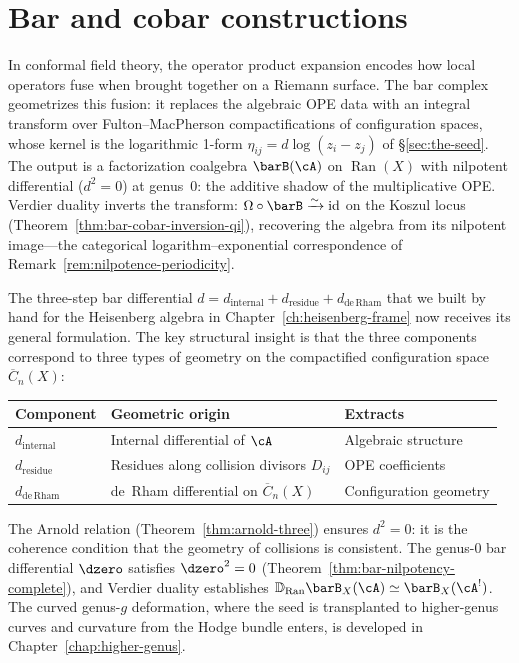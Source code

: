 \chapter{Bar and cobar constructions}
\label{chap:bar-cobar}



In conformal field theory, the operator product expansion encodes how local operators fuse when brought together on a Riemann surface.  The bar complex geometrizes this fusion: it replaces the algebraic OPE data with an integral transform over Fulton--MacPherson compactifications of configuration spaces, whose kernel is the logarithmic 1-form $\eta_{ij} = d\log(z_i - z_j)$ of \S\ref{sec:the-seed}.  The output is a factorization coalgebra $\barB(\cA)$ on $\operatorname{Ran}(X)$ with nilpotent differential ($d^2 = 0$) at genus~$0$: the additive shadow of the multiplicative OPE.  Verdier duality inverts the transform: $\Omega \circ \barB \xrightarrow{\sim} \mathrm{id}$ on the Koszul locus (Theorem~\ref{thm:bar-cobar-inversion-qi}), recovering the algebra from its nilpotent image---the categorical logarithm--exponential correspondence of Remark~\ref{rem:nilpotence-periodicity}.

The three-step bar differential
$d = d_{\mathrm{internal}} + d_{\mathrm{residue}}
+ d_{\mathrm{de\,Rham}}$ that we built by hand for the Heisenberg
algebra in Chapter~\ref{ch:heisenberg-frame} now receives its general
formulation.  The key structural insight is that the three components
correspond to three types of geometry on the compactified
configuration space $\overline{C}_n(X)$:
\begin{center}
\small
\begin{tabular}{lll}
\textbf{Component} & \textbf{Geometric origin} & \textbf{Extracts} \\
\hline
$d_{\mathrm{internal}}$ & Internal differential of $\cA$ & Algebraic structure \\
$d_{\mathrm{residue}}$ & Residues along collision divisors $D_{ij}$ & OPE coefficients \\
$d_{\mathrm{de\,Rham}}$ & de~Rham differential on $\overline{C}_n(X)$ & Configuration geometry
\end{tabular}
\end{center}

\noindent
The Arnold relation
(Theorem~\ref{thm:arnold-three}) ensures $d^2 = 0$: it is the
coherence condition that the geometry of collisions is consistent.
The genus-$0$ bar differential $\dzero$ satisfies $\dzero^2 = 0$
(Theorem~\ref{thm:bar-nilpotency-complete}), and Verdier duality
establishes $\mathbb{D}_{\operatorname{Ran}} \barB_X(\cA) \simeq
\barB_X(\cA^!)$.  The curved genus-$g$ deformation, where the seed is
transplanted to higher-genus curves and curvature from the Hodge
bundle enters, is developed in Chapter~\ref{chap:higher-genus}.

